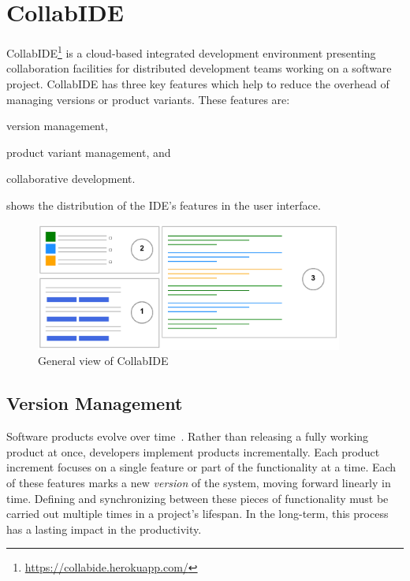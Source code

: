 
\section{CollabIDE}
\label{sec:collab-ide}

CollabIDE\footnote{\url{https://collabide.herokuapp.com/}} is a cloud-based integrated development environment presenting collaboration facilities 
for distributed development teams working on a software project.
CollabIDE has three key features which help to reduce the overhead of managing versions or product variants. These features are:
\begin{enumerate*}[label=(\arabic*)] 
\item version management, 
\item product variant management, and 
\item collaborative development.
\end{enumerate*}
  shows the distribution of the IDE's features in the user interface. 

\begin{figure}[tbp]
  \centering
  \includegraphics[width=0.9\textwidth]{img/collabIDEGeneral}
  \caption{General view of CollabIDE}
  \label{fig:general-view}
\end{figure}

\subsection{Version Management}
\label{sec:vcs}
Software products evolve over time~\cite{lehman02}. Rather than releasing a fully working product at 
once, developers implement products incrementally. Each product increment focuses on a single 
feature or part of the functionality at a time. Each of these features marks a new \emph{version} of the 
system, moving forward linearly in time. Defining and synchronizing between these pieces of 
functionality must be carried out multiple times in a project's lifespan. In the long-term, this process 
has a lasting impact in the productivity.

